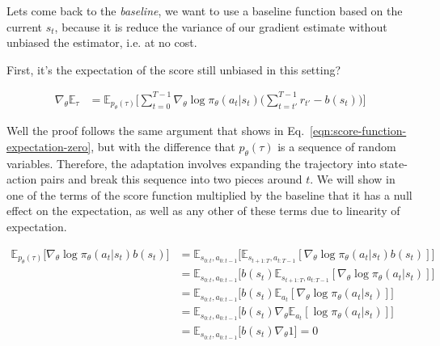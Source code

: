 Lets come back to the \textit{baseline}, we want to use a baseline function
based on the current $s_{t}$, because it is reduce the variance of our gradient
estimate without unbiased the estimator, i.e. at no cost.

First, it's the expectation of the score still unbiased in this setting?

\begin{equation}\label{eqn:reinforce-gradient-estimator-baseline}
    \begin{split}
        \nabla_{\theta}\mathbb{E}_{\tau} &= \mathbb{E}_{p_{\theta}(\tau)} \bigg[\sum_{t=0}^{T-1}\nabla_{\theta}\log\pi_{\theta}(a_{t}|s_{t}) \bigg( \sum_{t=t'}^{T-1} r_{t'}-b(s_{t}) \bigg) \bigg]
    \end{split}
\end{equation}

Well the proof follows the same argument that shows in Eq.~\ref{eqn:score-function-expectation-zero}, but with the difference that 
$p_{\theta}(\tau)$ is a sequence of random variables. Therefore,
the adaptation involves expanding the trajectory into state-action pairs and break this sequence into two pieces around $t$. We will show in one of the
terms  of the score function multiplied by the baseline that it has a null
effect on the expectation, as well as any other of these terms due to linearity of expectation.

\begin{equation}\label{eqn:reinforce-baseline-unbiased}
   \begin{split}
        \mathbb{E}_{p_{\theta}(\tau)}\big[\nabla_{\theta}\log\pi_{\theta}(a_t|s_t) b(s_t) \big] &= \mathbb{E}_{s_{0:t}, a_{0:t-1}}\big[\mathbb{E}_{s_{t+1:T}, a_{t:T-1}}[ \nabla_{\theta}\log \pi_{\theta}(a_{t}|s_{t})b(s_{t})]\big] \\
        &= \mathbb{E}_{s_{0:t}, a_{0:t-1}}\big[b(s_{t})\mathbb{E}_{s_{t+1:T}, a_{t:T-1}}[ \nabla_{\theta}\log \pi_{\theta}(a_{t}|s_{t})]\big] \\
        &= \mathbb{E}_{s_{0:t}, a_{0:t-1}}\big[b(s_{t})\mathbb{E}_{a_{t}}[ \nabla_{\theta}\log \pi_{\theta}(a_{t}|s_{t})]\big] \\
        &= \mathbb{E}_{s_{0:t}, a_{0:t-1}}\big[b(s_{t})\nabla_{\theta}\mathbb{E}_{a_{t}}[\log \pi_{\theta}(a_{t}|s_{t})]\big] \\
        &= \mathbb{E}_{s_{0:t}, a_{0:t-1}}\big[b(s_{t})\nabla_{\theta}1\big] = 0
   \end{split}
\end{equation}

